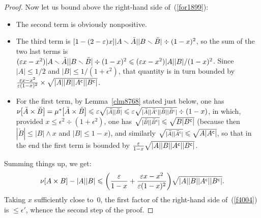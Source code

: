 \begin{proof}
Now let us bound above the right-hand side of~(\ref{for1899}):
\begin{itemize}
\item The second term is obviously nonpositive.
%
\item The third term is $[1-(2-\epsilon)x] \* |A\setminus\check{A}| \* |B\setminus\check{B}| \div (1-x)^2$, so the sum of the two last terms is~%
${(\epsilon x-x^2)} \* {|A\setminus\check{A}|} \* {|B\setminus\check{B}|} \div
(1-x)^2 \ab \leq (\epsilon x - x^2) \* |A| |B|/ \* (1-x)^2$.
Since $|A| \leq 1/2$ and $|B| \leq 1/\allowbreak{(1+\epsilon^2)}$, that quantity
is in turn bounded by~$\frac{\varepsilon x-x^2}{\varepsilon(1-x)^2} \times
\sqrt{|A||B||A^{\mathsf{c}}||B^{\mathsf{c}}|}$.
%
\item For the first term, by Lemma~\ref{clm8768} stated just below, one has
$\nu\big[\check{A}\times \check{B}\big] = \mu^*\big[\check{A}\times \check{B}\big]
\leq \epsilon \sqrt{\mathsmaller{\big|\check{A}\big|\big|\check{B}\big|}}
\leq \epsilon \sqrt{\mathsmaller{\big|\check{A}\big|\big|\C{\check{A}}\big|\big|\check{B}\big|\big|\C{\check{B}}\big|}} \div (1-x)$,
%
in which, provided $x \leq \epsilon^2 \div (1+\epsilon^2)$, one has
$\sqrt{\mathsmaller{\big|\check{B}\big|\big|\C{\check{B}}\big|}} \leq \sqrt{B|\C{B}|}$
(because then $|\check{B}| \leq |B|\wedge x$ and $|B| \leq 1-x$),
and similarly $\sqrt{\mathsmaller{\big|\check{A}\big|\big|\C{\check{A}}\big|}} \leq \sqrt{A|\C{A}|}$,
so that in the end the first term is bounded by
$\frac{\varepsilon}{1-x} \sqrt{|A||B||A^{\mathsf{c}}||B^{\mathsf{c}}|}$.
\end{itemize}
%
Summing things up, we get:
\[\label{f4004} \nu[A\times B] - |A||B| \leq
\bigg( \frac{\epsilon}{1-x} + \frac{\epsilon x-x^2}{\epsilon(1-x)^2} \bigg)
\sqrt{|A||B||\C{A}||\C{B}|} .\]
Taking $x$ sufficiently close to~$0$,
the first factor of the right-hand side of~(\ref{f4004}) is $\leq\epsilon'$,
whence the second step of the proof.
\end{proof}

